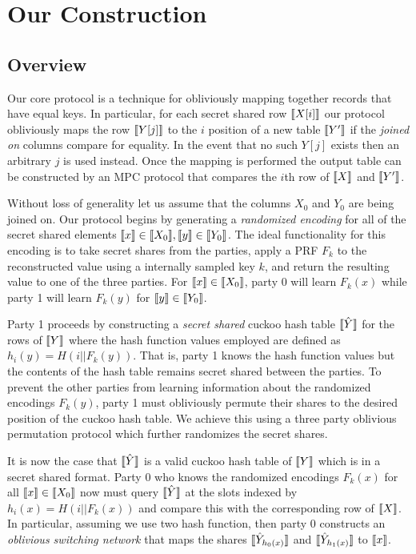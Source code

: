\section{Our Construction}



\subsection{Overview}

Our core protocol is a technique for obliviously mapping together records that have equal keys. In particular, for each secret shared row $\llbracket X[i]\rrbracket$ our protocol obliviously maps the row $\llbracket Y[j]\rrbracket$ to the $i$ position of a new table $\llbracket Y'\rrbracket$ if the \emph{joined on} columns compare for equality. In the event that no such $Y[j]$ exists then an arbitrary $j$ is used instead. Once the mapping is performed the output table can be constructed by an MPC protocol\cite{aby3} that compares the $i$th row of $\llbracket X\rrbracket$ and $\llbracket Y'\rrbracket$. 

Without loss of generality let us assume that the columns $X_0$ and $Y_0$ are being joined on. Our protocol begins by generating a \emph{randomized encoding} for all of the secret shared elements $\llbracket x\rrbracket\in \llbracket X_0\rrbracket, \llbracket y\rrbracket\in \llbracket Y_0\rrbracket$. The ideal functionality for this encoding is to take secret shares from the parties, apply a PRF $F_k$ to the reconstructed value using a internally sampled key $k$, and return the resulting value to one of the three parties. For $\llbracket x\rrbracket\in \llbracket X_0\rrbracket$, party 0 will learn $F_k(x)$ while party 1 will learn $F_k(y)$ for $\llbracket y\rrbracket\in \llbracket Y_0\rrbracket$.

Party 1 proceeds by constructing a \emph{secret shared} cuckoo hash table $\llbracket \hat Y\rrbracket$ for the rows of $\llbracket Y\rrbracket$ where the hash function values employed are defined as $h_i(y) = H( i || F_k(y))$. That is, party 1 knows the hash function values but the contents of the hash table remains secret shared between the parties. To prevent the other parties from learning information about the randomized encodings $F_k(y)$, party 1 must obliviously permute their shares to the desired position of the cuckoo hash table. We achieve this using a three party oblivious permutation protocol which further randomizes the secret shares.

It is now the case that $\llbracket \hat Y\rrbracket$ is a valid cuckoo hash table of $\llbracket Y\rrbracket$ which is in a secret shared format. Party 0 who knows the randomized encodings $F_k(x)$ for all $\llbracket x\rrbracket\in \llbracket X_0\rrbracket$ now must query $\llbracket \hat Y\rrbracket$ at the slots indexed by $h_i(x)= H( i || F_k(x))$ and compare this with the corresponding row of $\llbracket X\rrbracket$. In particular, assuming we use two hash function, then party 0 constructs an \emph{oblivious switching network} that maps the shares $\llbracket \hat Y_{h_0(x)}\rrbracket$ and $\llbracket \hat Y_{h_1(x)}\rrbracket$ to $\llbracket x\rrbracket$.

